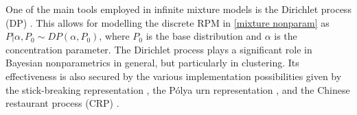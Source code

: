\documentclass[12pt,	%
	a4paper,		%
	twoside,		%
	openright,		%
	titlepage,%
	]{book}
\theoremstyle{definition}
\let\cite\citep
\begin{document}
One of the main tools employed in infinite mixture models is the Dirichlet process (DP) \cite{ferguson-dp}. This allows for modelling the discrete RPM in \eqref{mixture nonparam} as $P|\alpha,P_0 \sim DP(\alpha,P_0)$, where $P_0$ is the base distribution and $\alpha$ is the concentration parameter. The Dirichlet process plays a significant role in Bayesian nonparametrics in general, but particularly in clustering. Its effectiveness is also secured by the various implementation possibilities given by the stick-breaking representation \cite{seth-stick}, the Pólya urn representation \cite{polya-main}, and the Chinese restaurant process (CRP) \cite{aldous-crp}.
\end{document}
